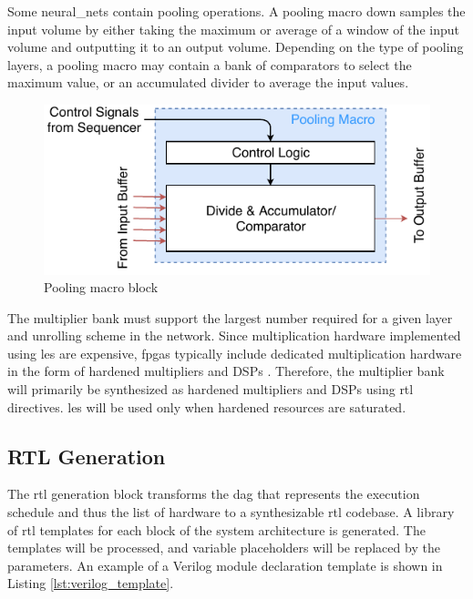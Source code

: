\documentclass{uw-ece-wkrpt}
\begin{document}
Some \glspl{neural_net} contain pooling operations. A pooling macro down samples the input volume by either taking the maximum or average of a window of the input volume and outputting it to an output volume. Depending on the type of pooling layers, a pooling macro may contain a bank of comparators to select the maximum value, or an accumulated divider to average the input values.

\begin{figure}
\centering
\includegraphics[width=\textwidth]{figures/pooling_macro}
\caption{Pooling macro block \cite{Ma2017An-automatic-RT}}\label{fig:pooling_macro}
\end{figure}

The multiplier bank must support the largest number required for a given layer and unrolling scheme in the network. Since multiplication hardware implemented using \glspl{le} are expensive, \glspl{fpga} typically include dedicated multiplication hardware in the form of hardened multipliers and DSPs \cite{Intel-Corp.2018IntelR-ArriaR-1}. Therefore, the multiplier bank will primarily be synthesized as hardened multipliers and DSPs using \gls{rtl} directives. \Glspl{le} will be used only when hardened resources are saturated.

\subsection{RTL Generation}\label{sec:rtl_gen}

The \gls{rtl} generation block transforms the \gls{dag} that represents the execution schedule and thus the list of hardware to a synthesizable \gls{rtl} codebase. A library of \gls{rtl} templates for each block of the system architecture is generated. The templates will be processed, and variable placeholders will be replaced by the parameters. An example of a Verilog module declaration template is shown in Listing \ref{lst:verilog_template}.
\end{document}
